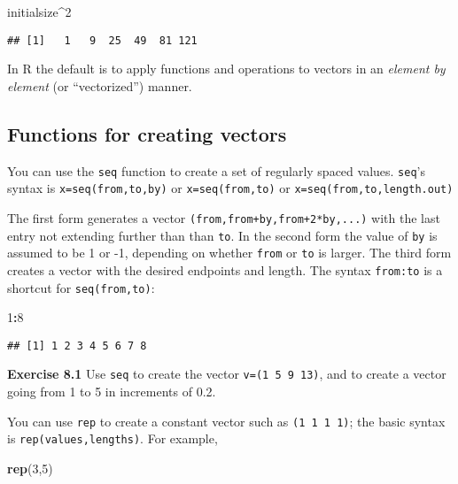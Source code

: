 \documentclass[11pt,]{article}
\newenvironment{Shaded}{\begin{snugshade}}{\end{snugshade}}
\newcommand{\KeywordTok}[1]{\textcolor[rgb]{0.13,0.29,0.53}{\textbf{#1}}}
\newcommand{\DecValTok}[1]{\textcolor[rgb]{0.00,0.00,0.81}{#1}}
\newcommand{\OperatorTok}[1]{\textcolor[rgb]{0.81,0.36,0.00}{\textbf{#1}}}
\newcommand{\NormalTok}[1]{#1}
\begin{document}
\begin{Shaded}
\begin{Highlighting}[]
\NormalTok{initialsize}\OperatorTok{^}\DecValTok{2}
\end{Highlighting}
\end{Shaded}

\begin{verbatim}
## [1]   1   9  25  49  81 121
\end{verbatim}

In R the default is to apply functions and operations to vectors in an
\emph{element by element} (or ``vectorized'') manner.

\subsection{Functions for creating
vectors}\label{functions-for-creating-vectors}

You can use the \texttt{seq} function to create a set of regularly
spaced values. \texttt{seq}'s syntax is \texttt{x=seq(from,to,by)} or
\texttt{x=seq(from,to)} or \texttt{x=seq(from,to,length.out)}

The first form generates a vector \texttt{(from,from+by,from+2*by,...)}
with the last entry not extending further than than \texttt{to}. In the
second form the value of \texttt{by} is assumed to be 1 or -1, depending
on whether \texttt{from} or \texttt{to} is larger. The third form
creates a vector with the desired endpoints and length. The syntax
\texttt{from:to} is a shortcut for \texttt{seq(from,to)}:

\begin{Shaded}
\begin{Highlighting}[]
\DecValTok{1}\OperatorTok{:}\DecValTok{8}
\end{Highlighting}
\end{Shaded}

\begin{verbatim}
## [1] 1 2 3 4 5 6 7 8
\end{verbatim}

\textbf{Exercise 8.1} Use \texttt{seq} to create the vector
\texttt{v=(1\ 5\ 9\ 13)}, and to create a vector going from 1 to 5 in
increments of 0.2.

You can use \texttt{rep} to create a constant vector such as
\texttt{(1\ 1\ 1\ 1)}; the basic syntax is \texttt{rep(values,lengths)}.
For example,

\begin{Shaded}
\begin{Highlighting}[]
\KeywordTok{rep}\NormalTok{(}\DecValTok{3}\NormalTok{,}\DecValTok{5}\NormalTok{)}
\end{Highlighting}
\end{Shaded}
\end{document}
